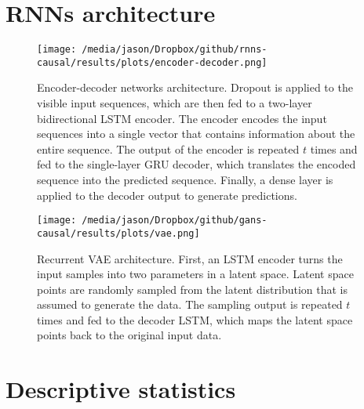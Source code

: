 \documentclass[12pt]{article}
\begin{document}
\begin{singlespacing}
\maketitle \thispagestyle{empty}
\tableofcontents \thispagestyle{empty}
\end{singlespacing}


\pagebreak
{}%

\section{RNNs architecture} 

\begin{figure}[htb]
	\begin{center}
		\texttt{[image: /media/jason/Dropbox/github/rnns-causal/results/plots/encoder-decoder.png]} \\
		\caption{Encoder-decoder networks architecture. Dropout is applied to the visible input sequences, which are then fed to a two-layer bidirectional LSTM encoder. The encoder encodes the input sequences into a single vector that contains information about the entire sequence. The output of the encoder is repeated $t$ times and fed to the single-layer GRU decoder, which translates the encoded sequence into the predicted sequence. Finally, a dense layer is applied to the decoder output to generate predictions. \label{encoder-decoder}} 
	\end{center}
\end{figure}

\begin{figure}[htbp]
	\begin{center}
		\texttt{[image: /media/jason/Dropbox/github/gans-causal/results/plots/vae.png]} \\
		\caption{Recurrent VAE architecture. First, an LSTM encoder turns the input samples into two parameters in a latent space. Latent space points are randomly sampled from the latent distribution that is assumed to generate the data. The sampling output is repeated $t$ times and fed to the decoder LSTM, which maps the latent space points back to the original input data.  \label{vae}} 
	\end{center}
\end{figure}

\section{Descriptive statistics}
\end{document}
